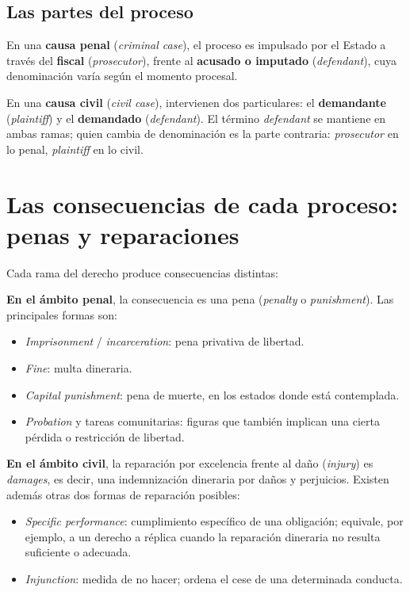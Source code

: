 \documentclass[12pt,oneside]{book}
\begin{document}
\subsection{Las partes del proceso}

En una \textbf{causa penal} (\textit{criminal case}), el proceso es impulsado por el Estado a través del \textbf{fiscal} (\textit{prosecutor}), frente al \textbf{acusado o imputado} (\textit{defendant}), cuya denominación varía según el momento procesal.

En una \textbf{causa civil} (\textit{civil case}), intervienen dos particulares: el \textbf{demandante} (\textit{plaintiff}) y el \textbf{demandado} (\textit{defendant}). El término \textit{defendant} se mantiene en ambas ramas; quien cambia de denominación es la parte contraria: \textit{prosecutor} en lo penal, \textit{plaintiff} en lo civil.

\section{Las consecuencias de cada proceso: penas y reparaciones}

Cada rama del derecho produce consecuencias distintas:

\textbf{En el ámbito penal}, la consecuencia es una pena (\textit{penalty} o \textit{punishment}). Las principales formas son:
\begin{itemize}
    \item \textit{Imprisonment} / \textit{incarceration}: pena privativa de libertad.
    \item \textit{Fine}: multa dineraria.
    \item \textit{Capital punishment}: pena de muerte, en los estados donde está contemplada.
    \item \textit{Probation} y tareas comunitarias: figuras que también implican una cierta pérdida o restricción de libertad.
\end{itemize}

\textbf{En el ámbito civil}, la reparación por excelencia frente al daño (\textit{injury}) es \textit{damages}, es decir, una indemnización dineraria por daños y perjuicios. Existen además otras dos formas de reparación posibles:
\begin{itemize}
    \item \textit{Specific performance}: cumplimiento específico de una obligación; equivale, por ejemplo, a un derecho a réplica cuando la reparación dineraria no resulta suficiente o adecuada.
    \item \textit{Injunction}: medida de no hacer; ordena el cese de una determinada conducta.
\end{itemize}
\end{document}
